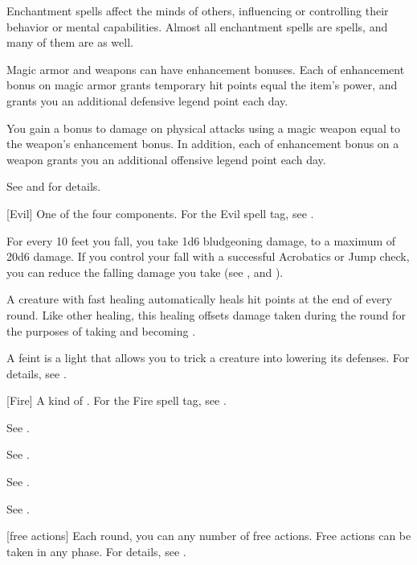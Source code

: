 Enchantment spells affect the minds of others, influencing or controlling their behavior or mental capabilities. Almost all enchantment spells are  spells, and many of them are  as well.

 Magic armor and weapons can have enhancement bonuses.
Each  of enhancement bonus on magic armor grants temporary hit points equal the item's power, and grants you an additional defensive legend point each day.

You gain a bonus to damage on physical attacks using a magic weapon equal to the weapon's enhancement bonus.
In addition, each  of enhancement bonus on a weapon grants you an additional offensive legend point each day.

See  and  for details.

[Evil] One of the four  components. For the Evil spell tag, see .

 For every 10 feet you fall, you take 1d6 bludgeoning damage, to a maximum of 20d6 damage.
If you control your fall with a successful Acrobatics or Jump check, you can reduce the falling damage you take (see , and ).

 A creature with fast healing automatically heals hit points at the end of every round.
Like other healing, this healing offsets damage taken during the round for the purposes of taking  and becoming \disabled.

 A feint is a light  that allows you to trick a creature into lowering its defenses.
For details, see .

[Fire] A kind of . For the Fire spell tag, see .

 See .

 See .

 See .

 See .

[free actions] Each round, you can any number of free actions.
Free actions can be taken in any phase.
For details, see .

